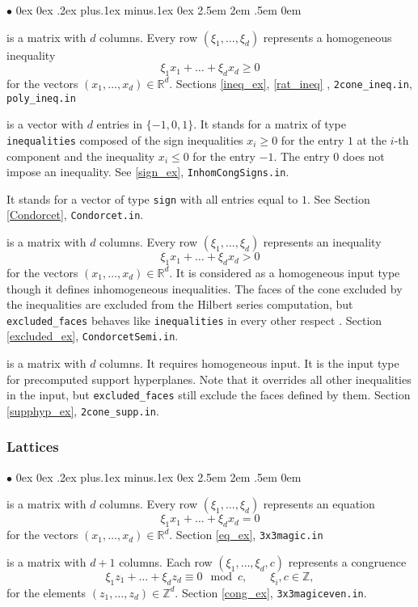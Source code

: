 \documentclass[12pt,a4paper]{scrartcl}
\newcommand{\stdli}{ \topsep0ex \partopsep0ex %
\parsep.2ex plus.1ex minus.1ex \itemsep0ex%
\leftmargin2.5em \labelwidth2em \labelsep.5em \rightmargin0em}%
\renewenvironment{itemize}{\begin{list}{{$\bullet$}}{\stdli}}{\end{list}}
\theoremstyle{definition}
\def\ZZ{{\mathbb Z}}
\def\RR{{\mathbb R}}
\def\itemtt[#1]{\item[\textbf{\ttt{#1}}]}
\def\ttt{\texttt}
\begin{document}
\begin{itemize}
	\itemtt[inequalities] is a matrix with $d$ columns. Every row $(\xi_1,\dots,\xi_d)$ represents a homogeneous inequality
	$$
	\xi_1x_1+\dots+\xi_dx_d\ge 0
	$$
	for the vectors $(x_1,\dots,x_d)\in\RR^d$. Sections \ref{ineq_ex}, \ref{rat_ineq} , \verb|2cone_ineq.in|, \verb|poly_ineq.in|
	
	\itemtt[signs] is a vector with $d$ entries in $\{-1,0,1\}$.
	It stands for a matrix of type \verb|inequalities| composed of the sign inequalities $x_i\ge 0$ for the entry $1$ at the $i$-th component and the inequality $x_i\le 0$ for the entry $-1$. The entry $0$ does not impose an inequality. See \ref{sign_ex}, \verb|InhomCongSigns.in|.
	
	\itemtt[nonnegative] It stands for a vector of type \verb|sign| with all entries equal to $1$. See Section \ref{Condorcet}, \verb|Condorcet.in|.
	
	\itemtt[excluded\_faces]  is a matrix with $d$ columns. Every row $(\xi_1,\dots,\xi_d)$ represents an inequality
	$$
	\xi_1x_1+\dots+\xi_dx_d> 0
	$$
	for the vectors $(x_1,\dots,x_d)\in\RR^d$. It is considered as a homogeneous input type though it defines inhomogeneous inequalities. The faces of the cone excluded by the inequalities are excluded from the Hilbert series computation, but \verb|excluded_faces| behaves like \verb|inequalities| in every other respect . 
	Section \ref{excluded_ex}, \verb|CondorcetSemi.in|.
	
	\itemtt[support\_hyperplanes] is a matrix with $d$ columns. It requires homogeneous input. It is the input type for precomputed support hyperplanes. Note that it overrides all other inequalities in the input, but \verb|excluded_faces| still exclude the faces defined by them. Section \ref{supphyp_ex}, \verb|2cone_supp.in|.
\end{itemize}

\subsubsection{Lattices}

\begin{itemize}
	\itemtt[equations] is a matrix with $d$ columns. Every row $(\xi_1,\dots,\xi_d)$ represents an equation
	$$
	\xi_1x_1+\dots+\xi_dx_d= 0
	$$
	for the vectors $(x_1,\dots,x_d)\in\RR^d$. Section \ref{eq_ex}, \verb|3x3magic.in|
	
	\itemtt[congruences] is a matrix with $d+1$ columns. Each row $(\xi_1,\dots,\xi_d,c)$ represents a congruence
	$$
	\xi_1z_1+\dots+\xi_dz_d\equiv 0 \mod c, \qquad \xi_i,c\in\ZZ,
	$$
	for the elements $(z_1,\dots,z_d)\in\ZZ^d$. Section \ref{cong_ex}, \verb|3x3magiceven.in|.
\end{itemize}
\end{document}
